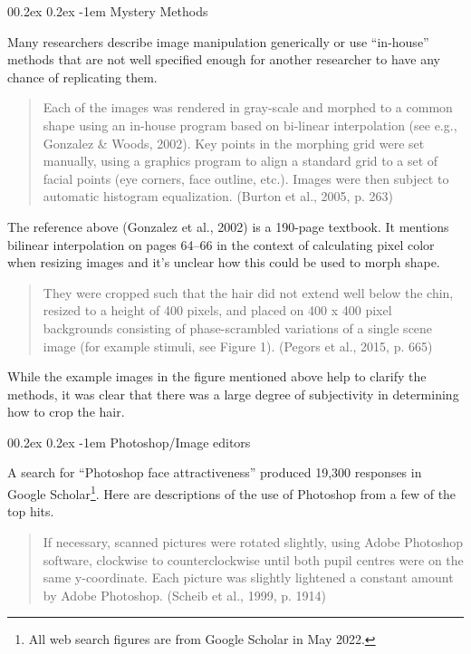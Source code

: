 \documentclass[
  doc,floatsintext]{apa6}
\makeatletter
\let\oldparagraph\paragraph
\renewcommand{\paragraph}[1]{\oldparagraph{#1}\mbox{}}
\renewcommand{\paragraph}{\@startsection{paragraph}{4}{\parindent}%
  {0\baselineskip \@plus 0.2ex \@minus 0.2ex}%
  {-1em}%
  {\normalfont\normalsize\bfseries\itshape\typesectitle}}
\makeatother
\begin{document}
\hypertarget{mystery-methods}{%
\paragraph{Mystery Methods}\label{mystery-methods}}

Many researchers describe image manipulation generically or use ``in-house'' methods that are not well specified enough for another researcher to have any chance of replicating them.

\begin{quote}
Each of the images was rendered in gray-scale and morphed to a common shape using an in-house program based on bi-linear interpolation (see e.g., Gonzalez \& Woods, 2002). Key points in the morphing grid were set manually, using a graphics program to align a standard grid to a set of facial points (eye corners, face outline, etc.). Images were then subject to automatic histogram equalization. (Burton et al., 2005, p. 263)
\end{quote}

The reference above (Gonzalez et al., 2002) is a 190-page textbook. It mentions bilinear interpolation on pages 64--66 in the context of calculating pixel color when resizing images and it's unclear how this could be used to morph shape.

\begin{quote}
They were cropped such that the hair did not extend well below the chin, resized to a height of 400 pixels, and placed on 400 x 400 pixel backgrounds consisting of phase-scrambled variations of a single scene image (for example stimuli, see Figure 1). (Pegors et al., 2015, p. 665)
\end{quote}

While the example images in the figure mentioned above help to clarify the methods, it was clear that there was a large degree of subjectivity in determining how to crop the hair.

\hypertarget{photoshopimage-editors}{%
\paragraph{Photoshop/Image editors}\label{photoshopimage-editors}}

A search for ``Photoshop face attractiveness'' produced 19,300 responses in Google Scholar\footnote{All web search figures are from Google Scholar in May 2022.}. Here are descriptions of the use of Photoshop from a few of the top hits.

\begin{quote}
If necessary, scanned pictures were rotated slightly, using Adobe Photoshop software, clockwise to counterclockwise until both pupil centres were on the same y-coordinate. Each picture was slightly lightened a constant amount by Adobe Photoshop. (Scheib et al., 1999, p. 1914)
\end{quote}
\end{document}

